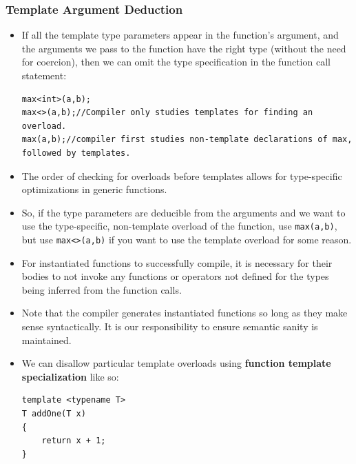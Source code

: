 \documentclass{report}
\begin{document}
\subsubsection{Template Argument Deduction}
\begin{itemize}
\item If all the template type parameters appear in the function's argument, and 
the arguments we pass to the function have the right type (without the need for coercion),
then we can omit the type specification in the function call statement:
\begin{lstlisting}
max<int>(a,b);
max<>(a,b);//Compiler only studies templates for finding an overload.
max(a,b);//compiler first studies non-template declarations of max, followed by templates. 
\end{lstlisting}
\item The order of checking for overloads before templates allows for type-specific optimizations in generic functions.
\item So, if the type parameters are deducible from the arguments and we want to use the type-specific, non-template
overload of the function, use \texttt{max(a,b)}, but use \texttt{max<>(a,b)} if you want to use the template overload
for some reason.
\item For instantiated functions to successfully compile, it is necessary for their bodies to not invoke any functions or operators not defined for the types being inferred from the function calls.
\item Note that the compiler generates instantiated functions so long as they make sense syntactically. It is our responsibility to ensure semantic sanity is maintained.
\item We can disallow particular template overloads using \textbf{function template specialization} like so:
\begin{lstlisting}
template <typename T>
T addOne(T x)
{
    return x + 1;
}


\end{lstlisting}
\end{itemize}
\end{document}
